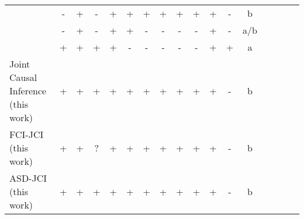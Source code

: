 \documentclass[twoside,11pt]{article}
\begin{document}
\begin{table}
\begin{tabular}{lcccccccccccccccc}
  \citep{Zhang++_IJCAI17}                 & -     &     + & -     & + & + & + & +     & + & + & + & -     & b \\%
  \citep{YangKatcoffUhler2018}            & -     &     + & -     & + & + & - & -     & - & - & + & -     & a/b \\
  \citep{ForreMooij_UAI_18}               & +     &     + & +     & + & - & - & -     & - & - & + & +     & a \\%
  \hline
  Joint Causal Inference (this work)      & +     &     + & +     & + & + & + & +     & + & + & + & -     & b \\%
  FCI-JCI (this work)                     & +     &     + & ?     & + & + & + & +     & + & + & + & -     & b \\%
  ASD-JCI (this work)                     & +     &     + & +     & + & + & + & +     & + & + & + & -     & b \\%

\end{tabular}
\end{table}
\end{document}
